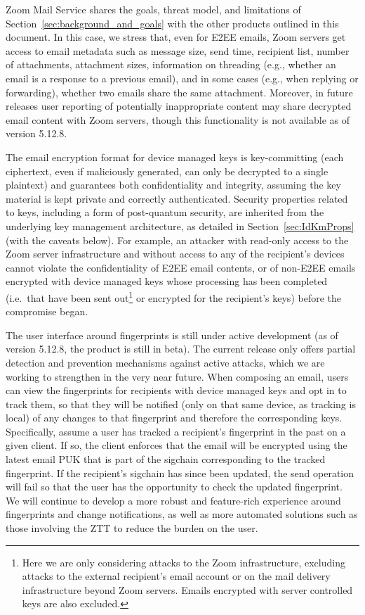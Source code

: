 Zoom Mail Service shares the goals, threat model, and limitations of
Section~\ref{sec:background_and_goals} with the other products outlined in this document. In this
case, we stress that, even for E2EE emails, Zoom servers get access to email metadata such as
message size, send time, recipient list, number of attachments, attachment sizes, information on
threading (e.g., whether an email is a response to a previous email), and in some cases (e.g., when
replying or forwarding), whether two emails share the same attachment. Moreover, in future releases
user reporting of potentially inappropriate content may share decrypted email content with Zoom
servers, though this functionality is not available as of version 5.12.8.

The email encryption format for device managed keys is key-committing (each ciphertext, even if
maliciously generated, can only be decrypted to a single plaintext) and guarantees both
confidentiality and integrity, assuming the key material is kept private and correctly
authenticated. Security properties related to keys, including a form of post-quantum security, are
inherited from the underlying key management architecture, as detailed in
Section~\ref{sec:IdKmProps} (with the caveats below). For example, an attacker with read-only access
to the Zoom server infrastructure and without access to any of the recipient's devices cannot
violate the confidentiality of E2EE email contents, or of non-E2EE emails encrypted with device
managed keys whose processing has been completed (i.e.\ that have been sent out\footnote{Here we are
only considering attacks to the Zoom infrastructure, excluding attacks to the external recipient's
email account or on the mail delivery infrastructure beyond Zoom servers. Emails encrypted with
server controlled keys are also excluded.} or encrypted for the recipient's keys) before the
compromise began.

The user interface around fingerprints is still under active development (as of version 5.12.8, the
product is still in beta). The current release only offers partial detection and prevention
mechanisms against active attacks, which we are working to strengthen in the very near future. When composing an email, users can view the fingerprints for recipients with device managed keys and opt in to track them, so that they will be notified (only on that same device, as tracking is local) of any changes to that fingerprint and therefore the corresponding keys. 
Specifically, assume a user has tracked a recipient's fingerprint in the past on a given client. If so, the client enforces that the email will be encrypted using the latest email PUK that is part of the sigchain corresponding to the tracked fingerprint. If
the recipient's sigchain has since been updated, the send operation will fail so
that the user has the opportunity to check the updated fingerprint. We will
continue to develop a more robust and feature-rich experience around fingerprints and change
notifications, as well as more automated solutions such as those involving the ZTT to reduce the
burden on the user.

